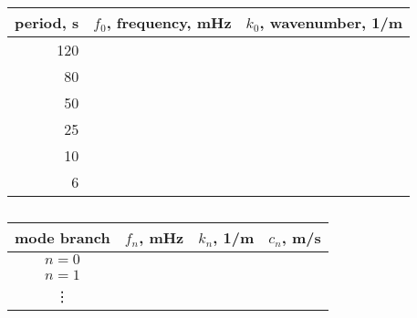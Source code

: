 \documentclass[11pt,titlepage,fleqn]{article}
\begin{document}
\begin{table}
\vspace{-5cm}
\centering
\caption[]
{{
\label{tab:k0}
}}
\begin{spacing}{1.5}
\begin{tabular}{r|r|r}
\hline\hline
period, s & $f_0$, frequency, mHz & $k_0$, wavenumber, 1/m  \\ \hline\hline
120 & & \\ \hline
80 & & \\ \hline
50 & &  \\ \hline
25 & & \\ \hline
10 & & \\ \hline
6 & &  \\ \hline
\end{tabular}
\end{spacing}
\end{table}

\begin{table}
\vspace{-5cm}
\centering
\caption[]
{{
\label{tab:T3}
}}
\begin{spacing}{1.5}
\begin{tabular}{c|c|c|c}
\hline\hline
mode branch & $f_n$, mHz & $k_n$, 1/m & $c_n$, m/s \\ \hline\hline
$n=0$ & \hspace{2cm} & \hspace{2cm} & \hspace{2cm} \\ \hline
$n=1$ & & & \\ \hline
\vdots & & & \\ \hline
\end{tabular}
\end{spacing}
\end{table}

\end{document}
